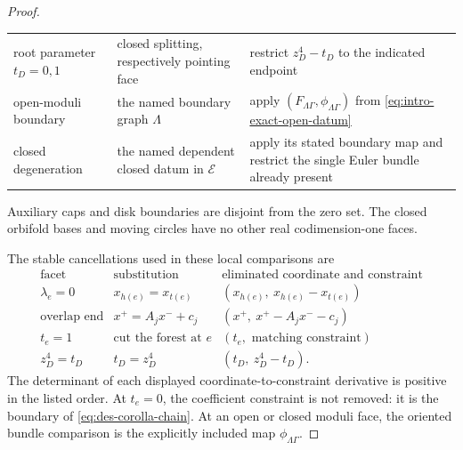 \begin{proof}
\begin{center}
\begin{tabularx}{\textwidth}{@{}
 >{\raggedright\arraybackslash}p{}
 >{\raggedright\arraybackslash}p{}
 >{\raggedright\arraybackslash}X@{}}
root parameter $t_D=0,1$ & closed splitting, respectively pointing face & restrict $z_D^4-t_D$ to the indicated endpoint\\
open-moduli boundary & the named boundary graph $\Lambda$ & apply $(F_{\Lambda\Gamma},\phi_{\Lambda\Gamma})$ from \eqref{eq:intro-exact-open-datum}\\
closed degeneration & the named dependent closed datum in $\mathcal E$ & apply its stated boundary map and restrict the single Euler bundle already present\\
\bottomrule
\end{tabularx}
\end{center}
Auxiliary caps and disk boundaries are disjoint from the zero set.  The
closed orbifold bases and moving circles have no other real
codimension-one faces.

The stable cancellations used in these local comparisons are
\begin{equation}
\begin{array}{c|c|c}
\text{facet}&\text{substitution}&\text{eliminated coordinate and constraint}\\ \hline
\lambda_e=0&x_{h(e)}=x_{t(e)}&(x_{h(e)},\ x_{h(e)}-x_{t(e)})\\
\text{overlap end}&x^+=A_jx^-+c_j&(x^+,\ x^+-A_jx^--c_j)\\
t_e=1&\text{cut the forest at }e&(t_e,\text{ matching constraint})\\
z_D^4=t_D& t_D=z_D^4&(t_D,\ z_D^4-t_D).
\end{array}
\label{eq:des-row-eliminations}
\end{equation}
The determinant of each displayed coordinate-to-constraint derivative is
positive in the listed order.  At $t_e=0$, the coefficient constraint is not removed: it is the
boundary of \eqref{eq:des-corolla-chain}.  At an open or closed moduli face,
the oriented bundle comparison is the explicitly included map
$\phi_{\Lambda\Gamma}$.


\end{proof}

